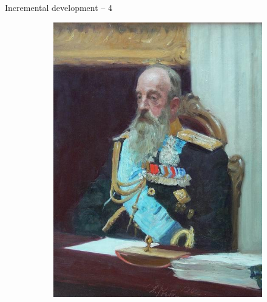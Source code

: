 \documentclass{beamer}
\begin{document}
\begin{frame}
{\centerline{Incremental development -- 4}}

\begin{figure}
\centering
\begin{subfigure}{.5\textwidth}
  \centering
  \includegraphics[width=.9\linewidth]{P2023.AIBCCSS.Drawing/sketch1.jpg}
\end{subfigure}%
\begin{subfigure}{.5\textwidth}
  \centering

\end{subfigure}
\end{figure}
\end{frame}
\end{document}
